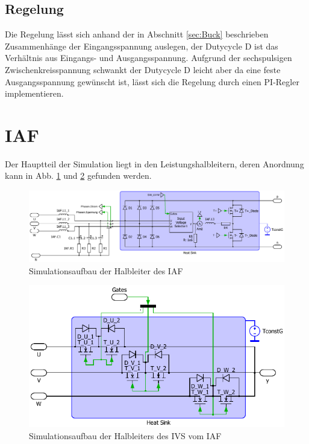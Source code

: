 	\subsection{Regelung}
	Die Regelung lässt sich anhand der in Abschnitt \ref{sec:Buck} beschrieben Zusammenhänge der Eingangsspannung auslegen, der Dutycycle \gls{D} ist das Verhältnis aus Eingangs- und Ausgangsspannung. Aufgrund der sechspulsigen Zwischenkreisspannung schwankt der Dutycycle \gls{D} leicht aber da eine feste Ausgangsspannung gewünscht ist, lässt sich die Regelung durch einen PI-Regler implementieren. 


\section{IAF}
	Der Hauptteil der Simulation liegt in den Leistungshalbleitern, deren Anordnung kann in Abb. \ref{fig:iafplecsmain} und \ref{fig:iafplecsivs} gefunden werden.  
	\begin{figure}
		\centering
		\includegraphics[width=1\linewidth]{content/Grafiken/IAF_Plecs_main}
		\caption{Simulationsaufbau der Halbleiter des IAF}
		\label{fig:iafplecsmain}
	\end{figure}
	\begin{figure}
		\centering
		\includegraphics[width=0.9\linewidth]{content/Grafiken/IAF_Plecs_IVS}
		\caption{Simulationsaufbau der Halbleiters des IVS vom IAF}
		\label{fig:iafplecsivs}
	\end{figure}
	
